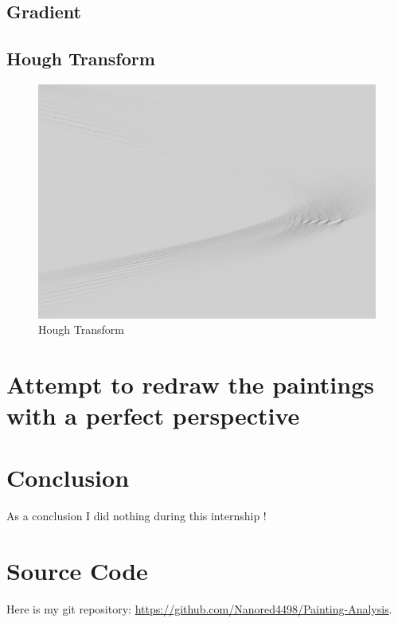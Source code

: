 \documentclass[10pt]{article}
\begin{document}
	\subsection{Gradient}
	
	\subsection{Hough Transform}
	
	\begin{figure}[h]
		\centering
		\includegraphics[scale=1.2]{hough_painting.png}
		\caption{Hough Transform}
	\end{figure}

	\section{Attempt to redraw the paintings with a perfect perspective}

	\section{Conclusion}
	
	As a conclusion I did nothing during this internship !
	
	\appendix
	
	\section{Source Code}
	
	Here is my git repository: \url{https://github.com/Nanored4498/Painting-Analysis}.

	
	
	
\end{document}
